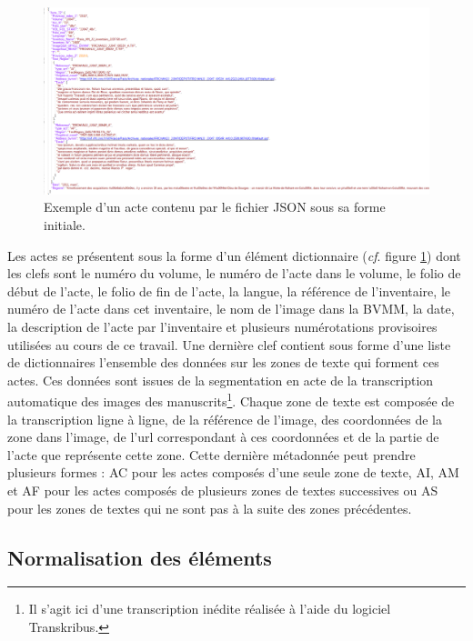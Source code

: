 \documentclass[a4paper,12pt,twoside]{book}
\begin{document}
	\begin{figure}
		\centering
		\includegraphics[width=\textwidth]{Images/json_zones_textes.png}
		\caption{Exemple d'un acte contenu par le fichier JSON sous sa forme initiale.}
		\label{json_initial}
	\end{figure}
	
	Les actes se présentent sous la forme d'un élément dictionnaire (\textit{cf}. figure \ref{json_initial}) dont les clefs sont le numéro du volume, le numéro de l'acte dans le volume, le folio de début de l'acte, le folio de fin de l'acte, la langue, la référence de l'inventaire, le numéro de l'acte dans cet inventaire, le nom de l'image dans la BVMM, la date, la description de l'acte par l'inventaire et plusieurs numérotations provisoires utilisées au cours de ce travail. Une dernière clef contient sous forme d'une liste de dictionnaires l'ensemble des données sur les zones de texte qui forment ces actes. Ces données sont issues de la segmentation en acte de la transcription automatique des images des manuscrits\footnote{Il s'agit ici d'une transcription inédite réalisée à l'aide du logiciel Transkribus.}. Chaque zone de texte est composée de la transcription ligne à ligne, de la référence de l'image, des coordonnées de la zone dans l'image, de l'url correspondant à ces coordonnées et de la partie de l'acte que représente cette zone. Cette dernière métadonnée peut prendre plusieurs formes : \og AC\fg{} pour les actes composés d'une seule zone de texte, \og AI\fg{}, \og AM\fg{} et \og AF\fg{} pour les actes composés de plusieurs zones de textes successives ou \og AS\fg{} pour les zones de textes qui ne sont pas à la suite des zones précédentes.
	
	\subsection{Normalisation des éléments}
	
\end{document}
